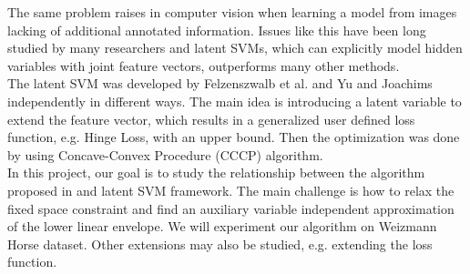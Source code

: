 \documentclass{article}
\begin{document}
	The same problem raises in computer vision when learning a model from images lacking of additional annotated information. Issues like this have been long studied by many researchers and latent SVMs, which can explicitly model hidden variables with joint feature vectors, outperforms many other methods. \\
	The latent SVM was developed by Felzenszwalb et al.\cite{felzenszwalb2008discriminatively} and Yu and Joachims\cite{yu2009learning} independently in different ways. The main idea is introducing a latent variable to extend the feature vector, which results in a generalized user defined loss function, e.g. Hinge Loss, with an upper bound. Then the optimization was done by using Concave-Convex Procedure (CCCP) algorithm.\\
	In this project, our goal is to study the relationship between the algorithm proposed in \cite{gouldlearning} and latent SVM framework. The main challenge is how to relax the fixed space constraint and find an auxiliary variable independent approximation of the lower linear envelope. We will experiment our algorithm on Weizmann Horse dataset\cite{borenstein2002class}\cite{borenstein2008combined}. Other extensions may also be studied, e.g. extending the loss function\cite{pletscher2012learning}.
\end{document}
